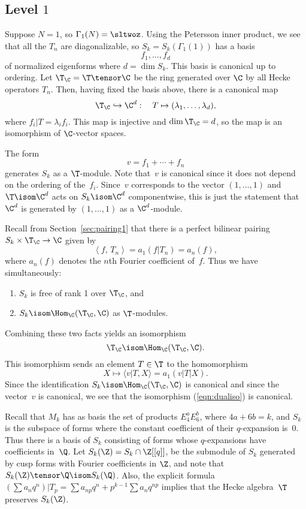 \documentclass{report}
\begin{document}
\subsection{Level $1$}
Suppose $N=1$, so $\Gamma_1(N)=\sltwoz$. Using the Petersson
inner product, we see that all the $T_n$ are diagonalizable, so
$S_k=S_k(\Gamma_1(1))$ has a basis
$$
   f_1,\ldots,f_d
$$
of normalized eigenforms where $d=\dim S_k$.  This basis is canonical
up to ordering.
Let $\T_{\C}=\T\tensor\C$ be the ring generated over $\C$ by
all Hecke operators $T_n$.
Then, having fixed the basis above, there is a canonical map
\[
  \T_{\C}\hookrightarrow{}\C^d: \quad T\mapsto(\lambda_1,\ldots,\lambda_d),
\]
where $f_i|T=\lambda_{i}f_i$.
This map is injective and $\dim\T_{\C}=d$, so the map is an
isomorphism of $\C$-vector spaces.

The form
\[
  v=f_1+\cdots+f_n
\]
generates $S_k$ as a $\T$-module.  Note that~$v$ is canonical since
it does not depend on the ordering of the~$f_i$.
Since~$v$ corresponds to the vector $(1,\ldots,1)$ and
$\T\isom\C^d$ acts on $S_k\isom\C^d$ componentwise, this
is just the statement that $\C^d$ is generated by
$(1,\ldots,1)$ as a $\C^d$-module.

Recall from Section~\ref{sec:pairing1}
that there is a perfect bilinear pairing $S_k\times \T_\C \to \C$
given by
\[
 \left\langle f,\, T_n\right\rangle = a_1(f|T_n)=a_n(f),
\]
where $a_n(f)$ denotes the $n$th Fourier coefficient of~$f$.
Thus we have simultaneously:
\begin{enumerate}
\item $S_k$ is free of rank 1 over $\T_\C$, and%
\item $S_k\isom \Hom_{\C}(\T_\C,\C)$ as $\T$-modules.
\end{enumerate}
Combining these two facts yields an isomorphism
\begin{equation}\label{eqn:dualiso}
  \T_\C \isom\Hom_{\C}(\T_\C,\C).
\end{equation}
This isomorphism sends
an element $T \in \T$ to the homomorphism
$$X \mapsto \langle v|T, X \rangle = a_1(v|T|X).$$
Since the identification $S_k\isom \Hom_{\C}(\T_\C,\C)$ is canonical
and since the vector~$v$ is canonical, we see that the isomorphism (\ref{eqn:dualiso})
is canonical.


Recall that $M_k$ has as basis the set of products $E_4^a E_6^b$,
where $4a+6b=k$, and $S_k$ is the subspace of forms where the
constant coefficient of their $q$-expansion is~$0$.  Thus there is
a basis of $S_k$ consisting of forms whose $q$-expansions have
coefficients in~$\Q$.  Let $S_k(\Z) = S_k \cap \Z[[q]]$, be the
submodule of $S_k$ generated by cusp forms with Fourier
coefficients in $\Z$, and note that $S_k(\Z)\tensor\Q \isom
S_k(\Q)$.  Also, the explicit formula $(\sum a_n q^n)|T_p = \sum
a_{np}q^n + p^{k-1} \sum a_n q^{np}$ implies that the Hecke
algebra~$\T$ preserves $S_k(\Z)$.
\end{document}
